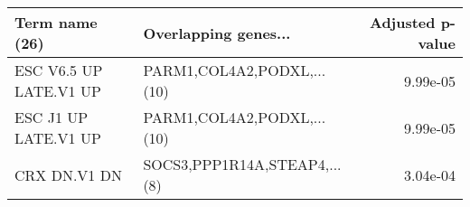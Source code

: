 \begin{tabular}{llr}
\toprule
        Term name (26) &         Overlapping genes... &  Adjusted p-value \\
\midrule
ESC V6.5 UP LATE.V1 UP &   PARM1,COL4A2,PODXL,...(10) &          9.99e-05 \\
  ESC J1 UP LATE.V1 UP &   PARM1,COL4A2,PODXL,...(10) &          9.99e-05 \\
          CRX DN.V1 DN & SOCS3,PPP1R14A,STEAP4,...(8) &          3.04e-04 \\
\bottomrule
\end{tabular}
